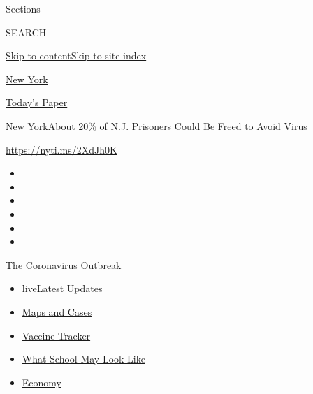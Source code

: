 Sections

SEARCH

\protect\hyperlink{site-content}{Skip to
content}\protect\hyperlink{site-index}{Skip to site index}

\href{https://www.nytimes.com/section/nyregion}{New York}

\href{https://myaccount.nytimes.com/auth/login?response_type=cookie\&client_id=vi}{}

\href{https://www.nytimes.com/section/todayspaper}{Today's Paper}

\href{/section/nyregion}{New York}\textbar{}About 20\% of N.J. Prisoners
Could Be Freed to Avoid Virus

\url{https://nyti.ms/2XdJh0K}

\begin{itemize}
\item
\item
\item
\item
\item
\item
\end{itemize}

\href{https://www.nytimes.com/news-event/coronavirus?action=click\&pgtype=Article\&state=default\&region=TOP_BANNER\&context=storylines_menu}{The
Coronavirus Outbreak}

\begin{itemize}
\tightlist
\item
  live\href{https://www.nytimes.com/2020/08/01/world/coronavirus-covid-19.html?action=click\&pgtype=Article\&state=default\&region=TOP_BANNER\&context=storylines_menu}{Latest
  Updates}
\item
  \href{https://www.nytimes.com/interactive/2020/us/coronavirus-us-cases.html?action=click\&pgtype=Article\&state=default\&region=TOP_BANNER\&context=storylines_menu}{Maps
  and Cases}
\item
  \href{https://www.nytimes.com/interactive/2020/science/coronavirus-vaccine-tracker.html?action=click\&pgtype=Article\&state=default\&region=TOP_BANNER\&context=storylines_menu}{Vaccine
  Tracker}
\item
  \href{https://www.nytimes.com/interactive/2020/07/29/us/schools-reopening-coronavirus.html?action=click\&pgtype=Article\&state=default\&region=TOP_BANNER\&context=storylines_menu}{What
  School May Look Like}
\item
  \href{https://www.nytimes.com/live/2020/07/31/business/stock-market-today-coronavirus?action=click\&pgtype=Article\&state=default\&region=TOP_BANNER\&context=storylines_menu}{Economy}
\end{itemize}

